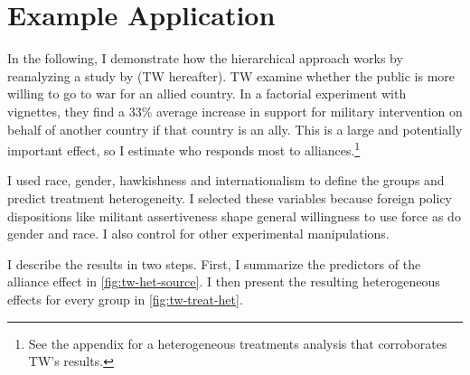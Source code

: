 \documentclass[12pt]{article}
\begin{document}



\section{Example Application} 


In the following, I demonstrate how the hierarchical approach works by reanalyzing a study by \citet{TomzWeeks2021} (TW hereafter). 
TW examine whether the public is more willing to go to war for an allied country.
In a factorial experiment with vignettes, they find a 33\% average increase in support for military intervention on behalf of another country if that country is an ally. 
This is a large and potentially important effect, so I estimate who responds most to alliances.\footnote{See the appendix for a heterogeneous treatments analysis that corroborates TW's results.}


I used race, gender, hawkishness and internationalism to define the groups and predict treatment heterogeneity.
I selected these variables because foreign policy dispositions like militant assertiveness shape general willingness to use force \citep{Kertzeretal2014} as do gender \citep{Barnhartetal2020} and race. 
I also control for other experimental manipulations. 


I describe the results in two steps. 
First, I summarize the predictors of the alliance effect in \autoref{fig:tw-het-source}.
I then present the resulting heterogeneous effects for every group in \autoref{fig:tw-treat-het}.
\end{document}

